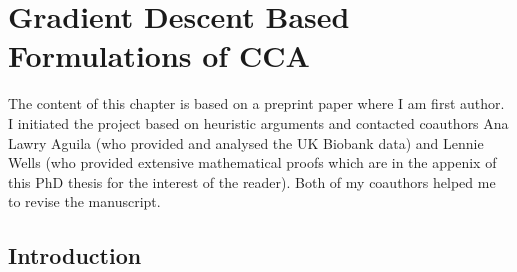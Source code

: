 \chapter{Gradient Descent Based Formulations of CCA}\label{ch:gradient_descent}
The content of this chapter is based on a preprint paper where I am first author.
I initiated the project based on heuristic arguments and contacted coauthors Ana Lawry Aguila (who provided and analysed the UK Biobank data) and Lennie Wells (who provided extensive mathematical proofs which are in the appenix of this PhD thesis for the interest of the reader).
Both of my coauthors helped me to revise the manuscript.
\minitoc
\section{Introduction} %

